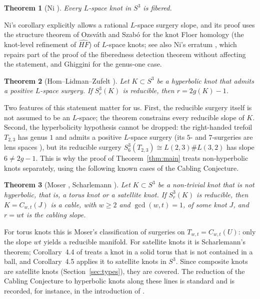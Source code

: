 \documentclass[11pt]{article}
\newcommand{\Surg}[2]{S^3_{#1}(#2)}
\newcommand{\HFhat}{\widehat{HF}}
\newtheorem{theorem}{Theorem}[section]
\theoremstyle{definition}
\theoremstyle{remark}
\begin{document}
\begin{theorem}[Ni {\cite[Corollary~1.3]{Ni2007}}]\label{thm:ni}
Every \(L\)-space knot in \(S^3\) is fibered.
\end{theorem}

Ni's corollary explicitly allows a rational \(L\)-space surgery slope,
and its proof uses the structure theorem of Ozsv\'ath and Szab\'o
\cite{OS2005} for the knot Floer homology (the knot-level refinement of
\(\HFhat\)) of \(L\)-space knots; see also
Ni's erratum \cite{NiCorrigendum}, which repairs part of the proof of
the fiberedness detection theorem without affecting the statement, and
Ghiggini \cite{Ghiggini2008} for the genus-one case.

\begin{theorem}[Hom--Lidman--Zufelt {\cite[Theorem~1.3]{HLZ2015}}]\label{thm:hlz}
Let \(K\subset S^3\) be a hyperbolic knot that admits a positive
\(L\)-space surgery. If \(\Surg{r}{K}\) is reducible, then
\(r=2g(K)-1\).
\end{theorem}

Two features of this statement matter for us. First, the reducible
surgery itself is not assumed to be an \(L\)-space; the theorem
constrains every reducible slope of \(K\). Second, the hyperbolicity
hypothesis cannot be dropped: the right-handed trefoil \(T_{2,3}\) has
genus \(1\) and admits a positive \(L\)-space surgery (its \(5\)- and
\(7\)-surgeries are lens spaces \cite{Moser1971}), but its reducible
surgery \(\Surg{6}{T_{2,3}}\cong L(2,3)\#L(3,2)\) has slope
\(6\neq 2g-1\).
This is why the proof of Theorem~\ref{thm:main} treats non-hyperbolic
knots separately, using the following known cases of the Cabling
Conjecture.

\begin{theorem}[Moser {\cite{Moser1971}}, Scharlemann {\cite[Corollaries~4.4--4.5]{Scharlemann1990}}]\label{thm:cabling}
Let \(K\subset S^3\) be a non-trivial knot that is not hyperbolic, that
is, a torus knot or a satellite knot. If \(\Surg{r}{K}\) is reducible,
then \(K=C_{w,t}(J)\) is a cable, with \(w\geq2\) and \(\gcd(w,t)=1\), of
some knot \(J\), and \(r=wt\) is the cabling slope.
\end{theorem}

For torus knots this is Moser's classification of surgeries on
\(T_{w,t}=C_{w,t}(U)\): only the slope \(wt\) yields a reducible
manifold. For satellite knots it is Scharlemann's theorem; Corollary~4.4
of \cite{Scharlemann1990} treats a knot in a solid torus that is not
contained in a ball, and Corollary~4.5 applies it to satellite knots in
\(S^3\). Since composite knots are satellite knots
(Section~\ref{sec:types}), they are covered. The reduction of the
Cabling Conjecture to hyperbolic knots along these lines is standard and
is recorded, for instance, in the introduction of \cite{HLZ2015}.
\end{document}
